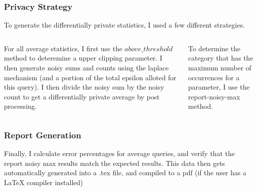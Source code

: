 \documentclass{beamer}
\begin{document}
\begin{frame}
\frametitle{Privacy Strategy}
To generate the differentially private statistics, I used a few different strategies. 
\newline
\begin{columns}

For all average statistics, I first use the $above\_threshold$ method to deteremine a upper clipping parameter. I then generate noisy sums and counts using the laplace mechanism (and a portion of the total epsilon alloted for this query). I then divide the noisy sum by the noisy count to get a differentially private average by post processing.

To determine the category that has the maximum number of occurrences for a parameter, I use the report-noisy-max method. 
\end{columns}
\end{frame}

\begin{frame}
\frametitle{Report Generation}
Finally, I calculate error percentages for average queries, and verify that the report noisy max results match the expected results. This data then gets automatically generated into a .tex file, and compiled to a pdf (if the user has a LaTeX compiler installed)

\end{frame}
\end{document}
